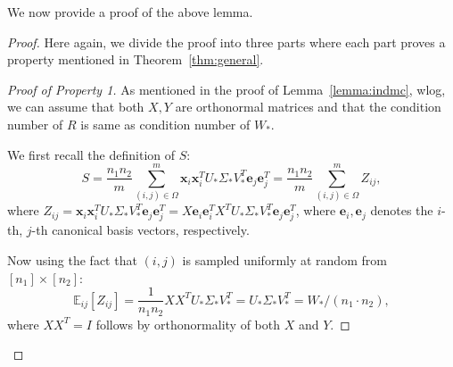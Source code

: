 \documentclass[11pt]{article}
\newcommand{\e}{\bm{e}}
\newcommand{\tp}[1]{{#1}^{T}}
\newcommand{\E}{\mathbb{E}}
\newcommand{\Vot}{\tp{V}_*}
\newcommand{\So}{\Sigma_*}
\newcommand{\Uo}{U_*}
\newcommand{\xti}{\tp{\x}_i}
\newcommand{\Wo}{W_*}
\newcommand{\x}{\bm{x}}
\newcommand{\eit}{\tp{\e}_i}
\newcommand{\etj}{\tp{\e}_j}
\newcommand{\ejt}{\tp{\e}_j}
\begin{document}
We now provide a proof of the above lemma. 
\begin{proof}
Here again, we divide the proof into three parts where each part proves a property mentioned in Theorem~\ref{thm:general}. 
\begin{proof}[Proof of Property 1]
As mentioned in the proof  of Lemma~\ref{lemma:indmc}, wlog, we can assume that  both $X, Y$ are orthonormal matrices and  that the condition number of $R$ is same as condition number of $\Wo$. 

We first recall the definition of $S$:
$$S=\frac{n_1n_2}{m}\sum_{(i,j)\in \Omega}^m \x_i\xti \Uo\So\Vot \e_j\etj=\frac{n_1n_2}{m}\sum_{(i,j)\in \Omega}^m Z_{ij},$$
where $Z_{ij}=\x_i\xti \Uo\So\Vot \e_j\etj = X \e_i \eit X^T \Uo\So\Vot \e_j \ejt $, where $\e_i, \e_j$ denotes the $i$-th, $j$-th canonical basis vectors, respectively. 



Now using the fact that $(i,j)$ is sampled uniformly at random from $[n_1]\times [n_2]$: %
$$\E_{ij}[Z_{ij}]=\frac{1}{n_1n_2} XX^T\Uo\So\Vot=\Uo\So\Vot=\Wo/(n_1\cdot n_2),$$ where $XX^T=I$ follows by orthonormality of both $X$ and $Y$. 


\end{proof}
\end{proof}
\end{document}
